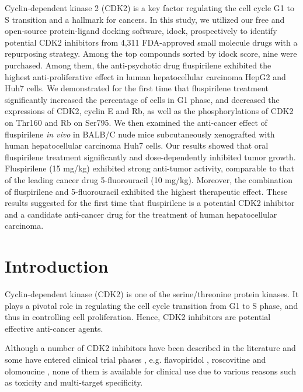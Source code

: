 \documentclass[10pt]{article}
\begin{document}
Cyclin-dependent kinase 2 (CDK2) is a key factor regulating the cell cycle G1 to S transition and a hallmark for cancers. In this study, we utilized our free and open-source protein-ligand docking software, idock, prospectively to identify potential CDK2 inhibitors from 4,311 FDA-approved small molecule drugs with a repurposing strategy. Among the top compounds sorted by idock score, nine were purchased. Among them, the anti-psychotic drug fluspirilene exhibited the highest anti-proliferative effect in human hepatocellular carcinoma HepG2 and Huh7 cells. We demonstrated for the first time that fluspirilene treatment significantly increased the percentage of cells in G1 phase, and decreased the expressions of CDK2, cyclin E and Rb, as well as the phosphorylations of CDK2 on Thr160 and Rb on Ser795. We then examined the anti-cancer effect of fluspirilene \textit{in vivo} in BALB/C nude mice subcutaneously xenografted with human hepatocellular carcinoma Huh7 cells. Our results showed that oral fluspirilene treatment significantly and dose-dependently inhibited tumor growth. Fluspirilene (15 mg/kg) exhibited strong anti-tumor activity, comparable to that of the leading cancer drug 5-fluorouracil (10 mg/kg). Moreover, the combination of fluspirilene and 5-fluorouracil exhibited the highest therapeutic effect. These results suggested for the first time that fluspirilene is a potential CDK2 inhibitor and a candidate anti-cancer drug for the treatment of human hepatocellular carcinoma.


\section*{Introduction}

Cyclin-dependent kinase (CDK2) is one of the serine/threonine protein kinases. It plays a pivotal role in regulating the cell cycle transition from G1 to S phase, and thus in controlling cell proliferation. Hence, CDK2 inhibitors are potential effective anti-cancer agents.

Although a number of CDK2 inhibitors have been described in the literature and some have entered clinical trial phases \cite{1603}, e.g. flavopiridol \cite{1596}, roscovitine \cite{1597} and olomoucine \cite{1598}, none of them is available for clinical use due to various reasons such as toxicity and multi-target specificity.
\end{document}
